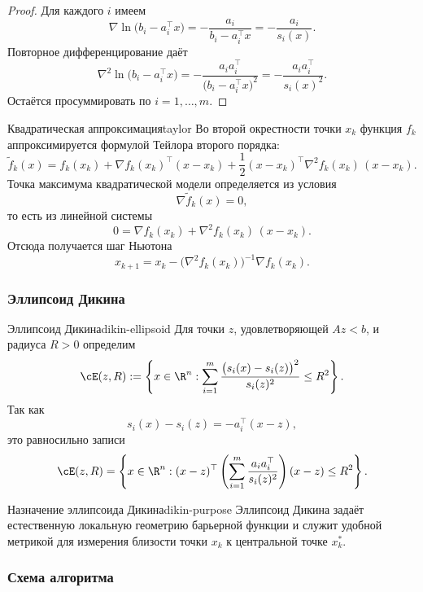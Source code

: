 \begin{proof}
	Для каждого \(i\) имеем
	\[
	\nabla \ln\bigl(b_i - a_i^\top x\bigr)
	=
	- \frac{a_i}{b_i - a_i^\top x}
	=
	- \frac{a_i}{s_i(x)}.
	\]
	Повторное дифференцирование даёт
	\[
	\nabla^2 \ln\bigl(b_i - a_i^\top x\bigr)
	=
	- \frac{a_i a_i^\top}{\bigl(b_i - a_i^\top x\bigr)^2}
	=
	- \frac{a_i a_i^\top}{s_i(x)^2}.
	\]
	Остаётся просуммировать по \(i=1,\dots,m\).
\end{proof}

\begin{Remark}{Квадратическая аппроксимация}{taylor}
	Во второй окрестности точки \(x_k\) функция \(f_k\) аппроксимируется формулой Тейлора второго порядка:
	\[
	\widetilde f_k(x)
	=
	f_k(x_k)
	+
	\nabla f_k(x_k)^\top (x - x_k)
	+
	\frac12 (x - x_k)^\top \nabla^2 f_k(x_k)\, (x - x_k).
	\]
	Точка максимума квадратической модели определяется из условия
	\[
	\nabla \widetilde f_k(x) = 0,
	\]
	то есть из линейной системы
	\[
	0 = \nabla f_k(x_k) + \nabla^2 f_k(x_k)\, (x - x_k).
	\]
	Отсюда получается шаг Ньютона
	\[
	x_{k+1}
	=
	x_k - \bigl(\nabla^2 f_k(x_k)\bigr)^{-1}\nabla f_k(x_k).
	\]
\end{Remark}

\subsubsection*{Эллипсоид Дикина}

\begin{Definition}{Эллипсоид Дикина}{dikin-ellipsoid}
	Для точки \(z\), удовлетворяющей \(A z < b\), и радиуса \(R > 0\) определим
	\[
	\cE(z,R)
	:=
	\left\{
	x \in \R^n :
	\sum_{i=1}^m
	\frac{\bigl(s_i(x)-s_i(z)\bigr)^2}{s_i(z)^2}
	\le R^2
	\right\}.
	\]
	Так как
	\[
	s_i(x)-s_i(z) = -a_i^\top (x-z),
	\]
	это равносильно записи
	\[
	\cE(z,R)
	=
	\left\{
	x \in \R^n :
	(x-z)^\top
	\left(
	\sum_{i=1}^m \frac{a_i a_i^\top}{s_i(z)^2}
	\right)
	(x-z)
	\le R^2
	\right\}.
	\]
\end{Definition}

\begin{Remark}{Назначение эллипсоида Дикина}{dikin-purpose}
	Эллипсоид Дикина задаёт естественную локальную геометрию барьерной функции и служит удобной метрикой
	для измерения близости точки \(x_k\) к центральной точке \(x_k^\ast\).
\end{Remark}

\subsubsection*{Схема алгоритма}

